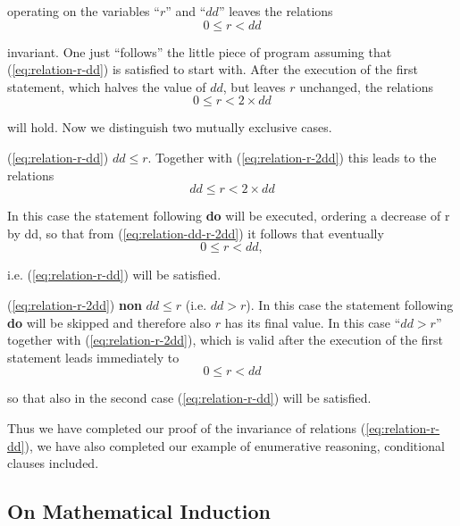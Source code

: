 \noindent
operating on the variables ``$r$'' and ``$dd$'' leaves the relations
\begin{equation}
	\label{eq:relation-r-dd}
	0 \leq r < dd
\end{equation}

\noindent
invariant. One just ``follows'' the little piece of program assuming that (\ref{eq:relation-r-dd}) is satisfied to start with. After the execution of the first statement, which halves the value of $dd$, but leaves $r$ unchanged, the relations
\begin{equation}
	\label{eq:relation-r-2dd}
	0 \leq r < 2\times dd
\end{equation}

\noindent
will hold. Now we distinguish two mutually exclusive cases.

(\ref{eq:relation-r-dd}) $dd \leq r$. Together with (\ref{eq:relation-r-2dd}) this leads to the relations
\begin{equation}
	\label{eq:relation-dd-r-2dd}
	dd \leq r < 2\times dd
\end{equation}

\noindent
In this case the statement following \textbf{do} will be executed, ordering a decrease of r by dd, so that from (\ref{eq:relation-dd-r-2dd}) it follows that eventually
\begin{equation*}
	0 \leq r < dd,
\end{equation*}

\noindent
i.e. (\ref{eq:relation-r-dd}) will be satisfied.

(\ref{eq:relation-r-2dd}) \textbf{non} $dd \leq r$ (i.e. $dd > r$). In this case the statement following \textbf{do} will be skipped and therefore also $r$ has its final value. In this case ``$dd > r$'' together with (\ref{eq:relation-r-2dd}), which is valid after the execution of the first statement leads immediately to
\begin{equation*}
	0 \leq r < dd
\end{equation*}

\noindent
so that also in the second case (\ref{eq:relation-r-dd}) will be satisfied.

Thus we have completed our proof of the invariance of relations (\ref{eq:relation-r-dd}), we have also completed our example of enumerative reasoning, conditional clauses included.

\subsection{On Mathematical Induction}

